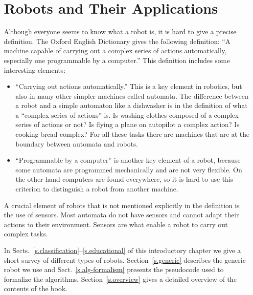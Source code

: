 
\chapter{Robots and Their Applications}\label{ch.basic}


Although everyone seems to know what a robot is, it is hard to give a precise definition. The Oxford English Dictionary gives the following definition: ``A machine capable of carrying out a complex series of actions automatically, especially one programmable by a computer.'' This definition includes some interesting elements:
\begin{itemize}
\item ``Carrying out actions automatically.'' This is a key element in robotics, but also in many other simpler machines called automata. The difference between a robot and a simple automaton like a dishwasher is in the definition of what a ``complex series of actions'' is. Is washing clothes composed of a complex series of actions or not? Is flying a plane on autopilot a complex action? Is cooking bread complex? For all these tasks there are machines that are at the boundary between automata and robots.
\item ``Programmable by a computer'' is another key element of a robot, because some automata are programmed mechanically and are not very flexible. On the other hand computers are found everywhere, so it is hard to use this criterion to distinguish a robot from another machine.
\end{itemize}
A crucial element of robots that is not mentioned explicitly in the definition is the use of sensors. Most automata do not have sensors and cannot adapt their actions to their environment. Sensors are what enable a robot to carry out complex tasks. 

In Sects.~\ref{s.classification}--\ref{s.educational} of this introductory chapter we give a short survey of different types of robots. Section~\ref{s.generic} describes the generic robot we use and Sect.~\ref{s.alg-formalism} presents the pseudocode used to formalize the algorithms. Section~\ref{s.overview} gives a detailed overview of the contents of the book.

